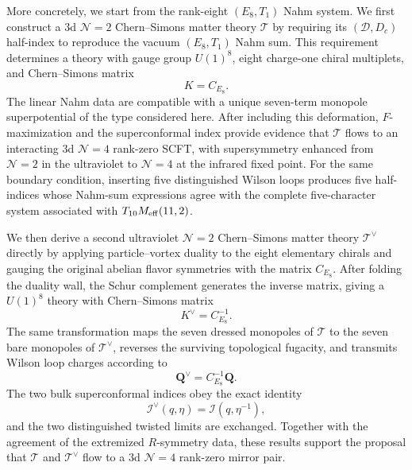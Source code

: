 \documentclass[11pt,a4paper]{article}
\numberwithin{equation}{section}
\begin{document}
More concretely, we start from the rank-eight $(E_8,T_1)$ Nahm system.  We first construct a 3d $\mathcal N=2$ Chern--Simons matter theory $\mathcal T$ by requiring its $(\mathcal D,D_c)$ half-index to reproduce the vacuum $(E_8,T_1)$ Nahm sum.  This requirement determines a theory with gauge group $U(1)^8$, eight charge-one chiral multiplets, and Chern--Simons matrix
\begin{equation}
  K=C_{E_8}.
  \label{eq:intro-CE8-theory}
\end{equation}
The linear Nahm data are compatible with a unique seven-term monopole superpotential of the type considered here.  After including this deformation, $F$-maximization and the superconformal index provide evidence that $\mathcal T$ flows to an interacting 3d $\mathcal N=4$ rank-zero SCFT, with supersymmetry enhanced from $\mathcal N=2$ in the ultraviolet to $\mathcal N=4$ at the infrared fixed point.  For the same boundary condition, inserting five distinguished Wilson loops produces five half-indices whose Nahm-sum expressions agree with the complete five-character system associated with $T_{10}M_{\rm eff}(11,2)$.

We then derive a second ultraviolet $\mathcal N=2$ Chern--Simons matter theory $\mathcal T^\vee$ directly by applying particle--vortex duality to the eight elementary chirals and gauging the original abelian flavor symmetries with the matrix $C_{E_8}$.  After folding the duality wall, the Schur complement generates the inverse matrix, giving a $U(1)^8$ theory with Chern--Simons matrix
\begin{equation}
  K^\vee=C_{E_8}^{-1}.
  \label{eq:intro-CE8-inverse-theory}
\end{equation}
The same transformation maps the seven dressed monopoles of $\mathcal T$ to the seven bare monopoles of $\mathcal T^\vee$, reverses the surviving topological fugacity, and transmits Wilson loop charges according to
\begin{equation}
  \boldsymbol Q^\vee=C_{E_8}^{-1}\boldsymbol Q.
  \label{eq:intro-Wilson-map}
\end{equation}
The two bulk superconformal indices obey the exact identity
\begin{equation}
  \mathcal I^\vee(q,\eta)=\mathcal I(q,\eta^{-1}),
  \label{eq:intro-SCI-mirror}
\end{equation}
and the two distinguished twisted limits are exchanged.  Together with the agreement of the extremized $R$-symmetry data, these results support the proposal that $\mathcal T$ and $\mathcal T^\vee$ flow to a 3d $\mathcal N=4$ rank-zero mirror pair.
\end{document}
